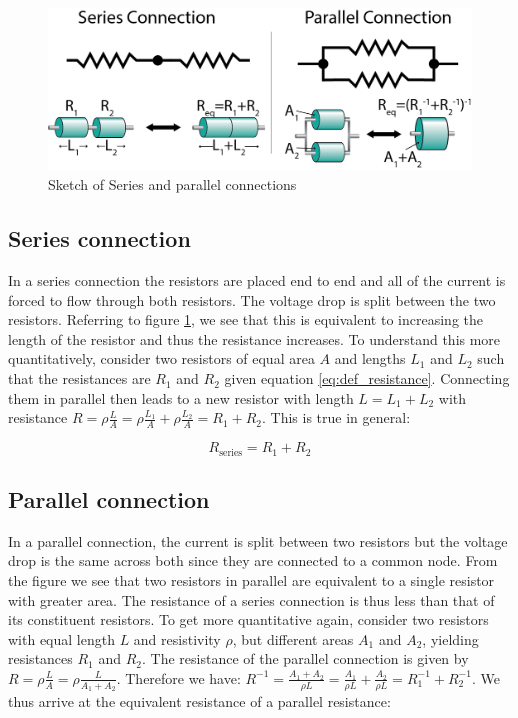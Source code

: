 \documentclass{tufte-book}
\begin{document}
\begin{figure}[h]
\caption{Sketch of Series and parallel connections}
\label{fig:res_series_parallel}
\begin{center}
\includegraphics[width=\textwidth]{res_series_parallel.png}
\end{center}
\end{figure}


\subsection{Series connection} In a series connection the resistors are placed end to end and all of the current is forced to flow through both resistors. The voltage drop is split between the two resistors. Referring to figure \ref{fig:res_series_parallel}, we see that this is equivalent to increasing the length of the resistor and thus the resistance increases. To understand this more quantitatively, consider two resistors of equal area $A$ and lengths $L_1$ and $L_2$ such that the resistances are $R_1$ and $R_2$ given equation \ref{eq:def_resistance}. Connecting them in parallel then leads to a new resistor with length $L = L_1 + L_2$ with resistance $R = \rho\frac{L}{A} = \rho\frac{L_1}{A} + \rho\frac{L_2}{A} = R_1 + R_2$.  This is true in general:

\begin{equation}\label{eq:series_res}
\boxed{R_{\text{series}} = R_1+R_2}
\end{equation}

\subsection{Parallel connection} In a parallel connection, the current is split between two resistors but the voltage drop is the same across both since they are connected to a common node. From the figure we see that two resistors in parallel are equivalent to a single resistor with greater area. The resistance of a series connection is thus less than that of its constituent resistors. To get more quantitative again, consider two resistors with equal length $L$ and resistivity $\rho$, but different areas $A_1$ and $A_2$, yielding resistances $R_1$ and $R_2$. The resistance of the parallel connection is given by $R = \rho\frac{L}{A} = \rho\frac{L}{A_1+A_2}$. Therefore we have: $R^{-1} = \frac{A_1+A_2}{\rho L} = \frac{A_1}{\rho L} + \frac{A_2}{\rho L} = R_1^{-1} + R_2^{-1}$. We thus arrive at the equivalent resistance of a parallel resistance:
\end{document}
